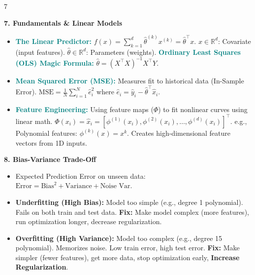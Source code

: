 \documentclass{article}
\newcommand{\R}{\mathbb{R}}
\newcommand{\hlhighlight}[1]{\par\vspace{1.5pt}\noindent\colorbox{yellow!50}{\parbox{\dimexpr\columnwidth-2\fboxsep\relax}{\textbf{#1}}}\par\vspace{0.5pt}}
\newcommand{\sectitle}[1]{\par\textbf{\color{blue!70!black}{#1}}\par}
\newcommand{\concept}[1]{\textcolor{teal}{\textbf{#1}}}
\newcommand{\category}[1]{\textcolor{green!60!black}{\textbf{#1}}}
\newcommand{\lbl}[1]{\textcolor{green!60!black}{\textbf{#1}}}
\begin{document}
\begin{multicols}{7}
\hlhighlight{7. Fundamentals \& Linear Models}
\sectitle{Predictors \& Engineering}
\begin{itemize}
    \item \concept{The Linear Predictor:} $f(x) = \sum_{k=1}^d \hat{\theta}^{(k)} x^{(k)} = \hat{\theta}^\top x$. $x \in \R^d$: Covariate (input features). $\hat{\theta} \in \R^d$: Parameters (weights). \concept{Ordinary Least Squares (OLS) Magic Formula:} $\hat{\theta} = (X^\top X)^{-1}X^\top Y$.
    \item \concept{Mean Squared Error (MSE):} Measures fit to historical data (In-Sample Error). $\text{MSE} = \frac{1}{N} \sum_{i=1}^N \hat{e}_i^2$ where $\hat{e}_i = \hat{y}_i - \hat{\theta}^\top \hat{x}_i$.
    \item \concept{Feature Engineering:} Using feature maps ($\Phi$) to fit nonlinear curves using linear math. $\Phi(x_i) = \hat{x}_i = [\phi^{(1)}(x_i), \phi^{(2)}(x_i), \dots, \phi^{(d)}(x_i)]^\top$. e.g., Polynomial features: $\phi^{(k)}(x) = x^k$. Creates high-dimensional feature vectors from 1D inputs.
\end{itemize}

\hlhighlight{8. Bias-Variance Trade-Off}
\sectitle{Model Complexity}
\begin{itemize}
    \item Expected Prediction Error on unseen data: $\text{Error} = \text{Bias}^2 + \text{Variance} + \text{Noise Var.}$
    \item \category{Underfitting (High Bias):} Model too simple (e.g., degree 1 polynomial). Fails on both train and test data. \lbl{Fix:} Make model complex (more features), run optimization longer, decrease regularization.
    \item \category{Overfitting (High Variance):} Model too complex (e.g., degree 15 polynomial). Memorizes noise. Low train error, high test error. \lbl{Fix:} Make simpler (fewer features), get more data, stop optimization early, \lbl{Increase Regularization}.
\end{itemize}


\end{multicols}
\end{document}
